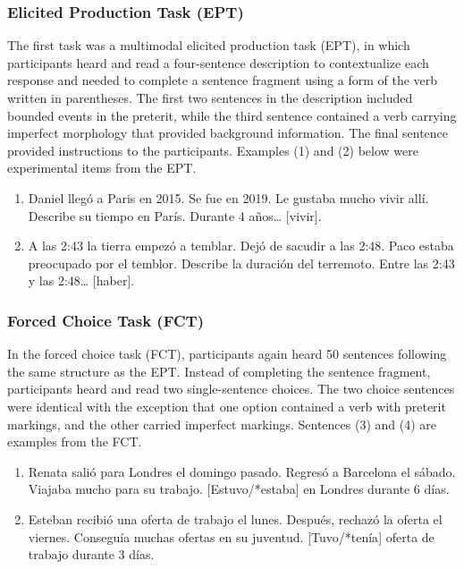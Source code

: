\documentclass[
  english,
  man,floatsintext]{apa6}
\begin{document}
\hypertarget{elicited-production-task-ept}{%
\subsubsection{Elicited Production Task (EPT)}\label{elicited-production-task-ept}}

The first task was a multimodal elicited production task (EPT), in which participants heard and read a four-sentence description to contextualize each response and needed to complete a sentence fragment using a form of the verb written in parentheses. The first two sentences in the description included bounded events in the preterit, while the third sentence contained a verb carrying imperfect morphology that provided background information. The final sentence provided instructions to the participants. Examples (1) and (2) below were experimental items from the EPT.

\begin{enumerate}
\def\labelenumi{\arabic{enumi}.}
\item
  Daniel llegó a Paris en 2015. Se fue en 2019. Le gustaba mucho vivir allí. Describe su tiempo en París. Durante 4 años\ldots{} {[}vivir{]}.
\item
  A las 2:43 la tierra empezó a temblar. Dejó de sacudir a las 2:48. Paco estaba preocupado por el temblor. Describe la duración del terremoto. Entre las 2:43 y las 2:48\ldots{} {[}haber{]}.
\end{enumerate}

\hypertarget{forced-choice-task-fct}{%
\subsubsection{Forced Choice Task (FCT)}\label{forced-choice-task-fct}}

In the forced choice task (FCT), participants again heard 50 sentences following the same structure as the EPT. Instead of completing the sentence fragment, participants heard and read two single-sentence choices. The two choice sentences were identical with the exception that one option contained a verb with preterit markings, and the other carried imperfect markings. Sentences (3) and (4) are examples from the FCT.

\begin{enumerate}
\def\labelenumi{\arabic{enumi}.}
\setcounter{enumi}{2}
\item
  Renata salió para Londres el domingo pasado. Regresó a Barcelona el sábado. Viajaba mucho para su trabajo. {[}Estuvo/*estaba{]} en Londres durante 6 días.
\item
  Esteban recibió una oferta de trabajo el lunes. Después, rechazó la oferta el viernes. Conseguía muchas ofertas en su juventud. {[}Tuvo/*tenía{]} oferta de trabajo durante 3 días.
\end{enumerate}
\end{document}
